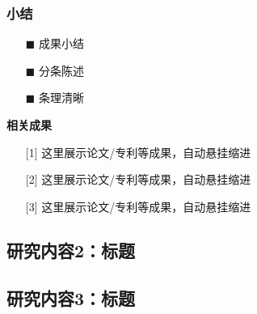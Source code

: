 \documentclass[9pt,fontset=windows]{ctexbeamer}
\begin{document}
	\begin{frame}[t]
		\frametitle{小结}
		\begin{itemize}
			\setlength{\itemsep}{2mm}
			\heiti\large
			\item[$\blacksquare$] 成果小结
			\item[$\blacksquare$] 分条陈述
			\item[$\blacksquare$] 条理清晰
		\end{itemize}
		\vspace{3mm}
		\begin{block}{{\bf 相关成果}}
			\begin{itemize}
				\item[{[1]}] 这里展示论文/专利等成果，自动悬挂缩进
				\item[{[2]}] 这里展示论文/专利等成果，自动悬挂缩进
				\item[{[3]}] 这里展示论文/专利等成果，自动悬挂缩进
			\end{itemize}
		\end{block}
	\end{frame}
	
	\subsection{研究内容2：标题}

	\subsection{研究内容3：标题}
\end{document}
